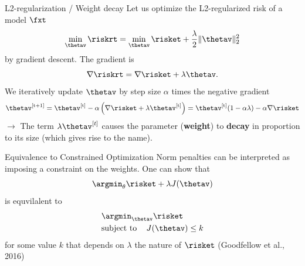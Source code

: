 \begin{vbframe}{L2-regularization / Weight decay}
Let us optimize the L2-regularized risk of a model $\fxt$
\[\min_{\thetav} \riskrt = \min_{\thetav} \risket + \frac{\lambda}{2} \|\thetav\|^2_2\]
by gradient descent. The gradient is
\[\nabla \riskrt = \nabla \risket + \lambda \thetav.\]
We iteratively update $\thetav$ by step size \(\alpha\) times the
negative gradient
\[\thetav^{[\text{t+1}]} = \thetav^{[\text{t}]} - \alpha \left(\nabla \risket + \lambda \thetav^{[\text{t}]}\right) =
\thetav^{[\text{t}]} (1 - \alpha \lambda) - \alpha \nabla \risket\]
$\to$ The term \(\lambda \thetav^{[t]}\) causes the parameter
(\textbf{weight}) to \textbf{decay} in proportion to its size (which gives rise to the name). 
\end{vbframe}


\begin{frame}{Equivalence to Constrained Optimization}
Norm penalties can be interpreted as imposing a constraint on the weights. One can show that 
 $$\argmin_{\theta} \risket + \lambda \text{\(J(\thetav)\)}$$
 is equvilalent to
 \begin{align*}
 & \argmin_{\thetav}  \risket \\
  &\text{subject to \;\;\;}  J(\thetav) \leq k
 \end{align*}
  for some value $k$ that depends on $\lambda$ the nature of 
 $\risket$ (Goodfellow et al., 2016)
\end{frame}


